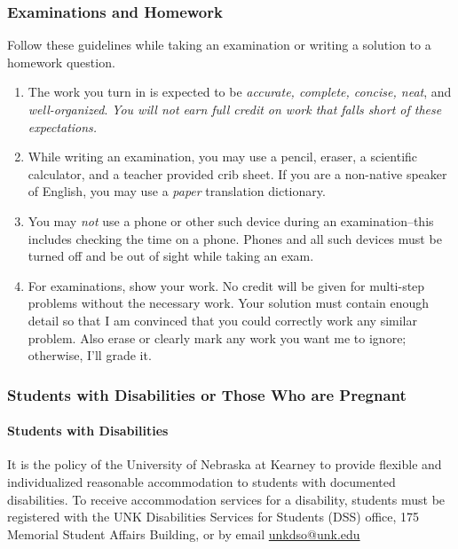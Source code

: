 \documentclass[12pt]{article}
\newcounter{ex}\setcounter{ex}{0}
\begin{document}
\subsubsection*{Examinations and Homework}

Follow these guidelines while taking an examination or writing a solution to a homework question.

\begin{enumerate}

\item The work you turn in is expected to be \emph{accurate, complete, concise, neat}, and \emph{well-organized}.  \emph{You will not earn
full credit on work that falls short of these expectations.}




\item While writing an examination, you may use a pencil, eraser, a scientific calculator, and a teacher provided crib sheet. If you are a non-native speaker of English,
you may use a \emph{paper} translation dictionary.  

\item  You may \emph{not} use a phone or other such device during an examination--this includes checking the time on a phone. Phones and all such devices must be turned off and be out of sight while taking an exam. 



\item For examinations, show your work.  No credit will be given for multi-step problems without the necessary work. Your solution must contain enough detail
so that I am convinced that you could correctly work any similar problem. Also erase or clearly mark any work you want me to ignore; otherwise,
I'll grade it.  

\end{enumerate}


\subsubsection*{Students with Disabilities or Those Who are Pregnant}

\paragraph{Students with Disabilities} It is the policy of the University of Nebraska 
at Kearney to provide flexible and individualized reasonable 
accommodation to students with documented disabilities. To receive 
accommodation services for a disability, students must be
registered with the UNK Disabilities Services for Students (DSS) 
office, 175 Memorial Student Affairs Building, 
 or 
by email \href{mailto:unkdso@unk.edu}{unkdso@unk.edu}
\end{document}
